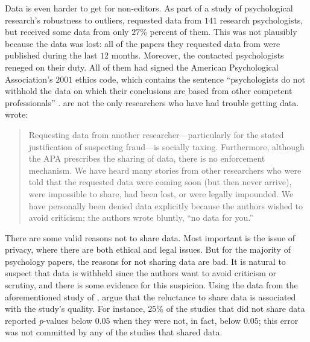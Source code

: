 Data is even harder to get for non-editors. As part of a study of psychological research's robustness to outliers, \textcite{Wicherts2006-yy} requested data from $141$ research psychologists, but received some data from only $27\%$ percent of them. This was not plausibly because the data was lost: all of the papers they requested data from were published during the last $12$ months. Moreover, the contacted psychologists reneged on their duty. All of them had signed the American Psychological Association's $2001$ ethics code, which contains the sentence ``psychologists do not withhold the data on which their conclusions are based from other competent professionals'' \parencite[p. 396; as cited in Wicherts et al. 2006][]{American_Psychological_Association2001-rs}. 
\textcite{Wicherts2006-yy} are not the only researchers who have had trouble getting data. \textcite[p. 526]{Nelson2018-ov} wrote: 
\begin{quote} Requesting data from another researcher---particularly for the stated justification of suspecting fraud---is socially taxing. Furthermore, although the APA prescribes the sharing of data, there is no enforcement mechanism. We have heard many stories from other researchers who were told that the requested data were coming soon (but then never arrive), were impossible to share, had been lost, or were legally impounded. We have personally been denied data explicitly because the authors wished to avoid criticism; the authors wrote bluntly, \textquotedblleft no data for you.''
\end{quote}
There are some valid reasons not to share data. Most important is the issue of privacy, where there are both ethical and legal issues. But for the majority of psychology papers, the reasons for not sharing data are bad. It is natural to suspect that data is withheld since the authors want to avoid criticism or scrutiny, and there is some evidence for this suspicion. Using the data from the aforementioned study of \textcite{Wicherts2006-yy}, \textcite{Wicherts2011-eb} argue that the reluctance to share data is associated with the study's quality. For instance, $25\%$ of the studies that did not share data reported \textit{p}-values below $0.05$ when they were not, in fact, below $0.05$; this error was not committed by any of the studies that shared data.

